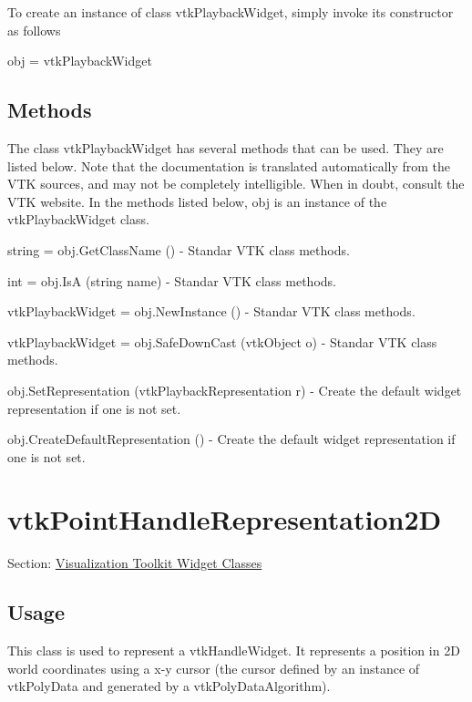 To create an instance of class vtk\-Playback\-Widget, simply invoke its constructor as follows \begin{DoxyVerb}  obj = vtkPlaybackWidget
\end{DoxyVerb}
 \hypertarget{vtkwidgets_vtkxyplotwidget_Methods}{}\subsection{Methods}\label{vtkwidgets_vtkxyplotwidget_Methods}
The class vtk\-Playback\-Widget has several methods that can be used. They are listed below. Note that the documentation is translated automatically from the V\-T\-K sources, and may not be completely intelligible. When in doubt, consult the V\-T\-K website. In the methods listed below, {\ttfamily obj} is an instance of the vtk\-Playback\-Widget class. 
\begin{DoxyItemize}
\item {\ttfamily string = obj.\-Get\-Class\-Name ()} -\/ Standar V\-T\-K class methods.  
\item {\ttfamily int = obj.\-Is\-A (string name)} -\/ Standar V\-T\-K class methods.  
\item {\ttfamily vtk\-Playback\-Widget = obj.\-New\-Instance ()} -\/ Standar V\-T\-K class methods.  
\item {\ttfamily vtk\-Playback\-Widget = obj.\-Safe\-Down\-Cast (vtk\-Object o)} -\/ Standar V\-T\-K class methods.  
\item {\ttfamily obj.\-Set\-Representation (vtk\-Playback\-Representation r)} -\/ Create the default widget representation if one is not set.  
\item {\ttfamily obj.\-Create\-Default\-Representation ()} -\/ Create the default widget representation if one is not set.  
\end{DoxyItemize}\hypertarget{vtkwidgets_vtkpointhandlerepresentation2d}{}\section{vtk\-Point\-Handle\-Representation2\-D}\label{vtkwidgets_vtkpointhandlerepresentation2d}
Section\-: \hyperlink{sec_vtkwidgets}{Visualization Toolkit Widget Classes} \hypertarget{vtkwidgets_vtkxyplotwidget_Usage}{}\subsection{Usage}\label{vtkwidgets_vtkxyplotwidget_Usage}
This class is used to represent a vtk\-Handle\-Widget. It represents a position in 2\-D world coordinates using a x-\/y cursor (the cursor defined by an instance of vtk\-Poly\-Data and generated by a vtk\-Poly\-Data\-Algorithm).


